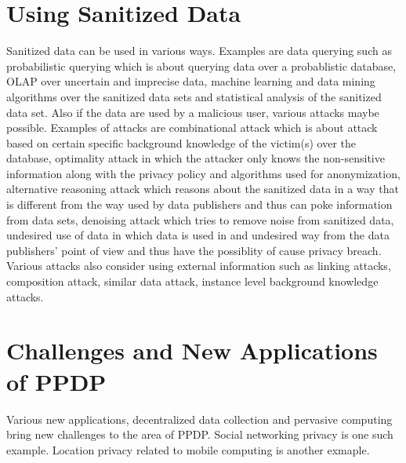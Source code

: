 \documentclass[12pt]{article}
\begin{document}
\section*{Using Sanitized Data} 
Sanitized data can be used in various ways. Examples are data querying
such as probabilistic querying which is about querying data over a
probablistic database, OLAP over uncertain and imprecise data, machine
learning and data mining algorithms over the sanitized data sets and
statistical analysis of the sanitized data set. Also if the data are
used by a malicious user, various attacks maybe possible. Examples of
attacks are combinational attack which is about attack based on
certain specific background knowledge of the victim(s) over the
database, optimality attack in which the attacker only knows the
non-sensitive information along with the privacy policy and algorithms
used for anonymization, alternative reasoning attack which reasons
about the sanitized data in a way that is different from the way used
by data publishers and thus can poke information from data sets,
denoising attack which tries to remove noise from sanitized data,
undesired use of data in which data is used in and undesired way from
the data publishers' point of view and thus have the possiblity of
cause privacy breach. Various attacks also consider using external
information such as linking attacks, composition attack, similar data
attack, instance level background knowledge attacks.  

\section*{Challenges and New Applications of PPDP} 
Various new applications, decentralized data collection and pervasive
computing bring new challenges to the area of PPDP. Social networking
privacy is one such example. Location privacy related to mobile
computing is another exmaple.  
\end{document}
